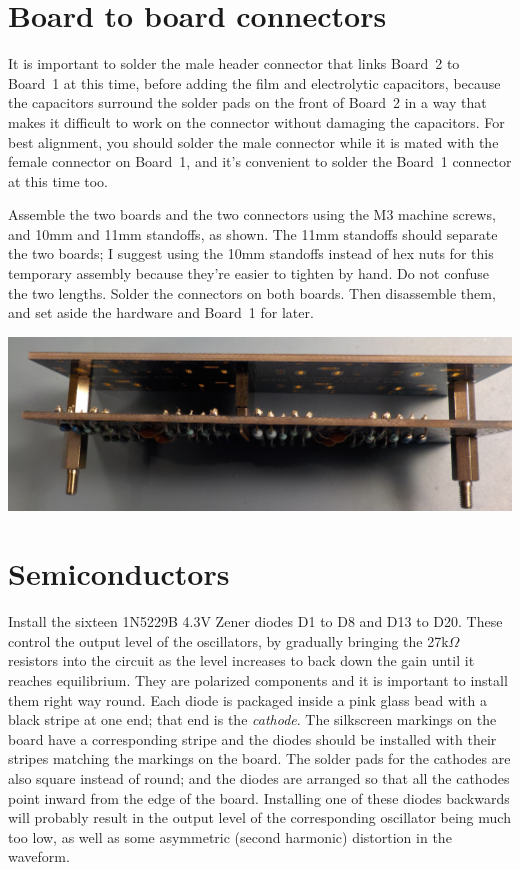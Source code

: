 \section{Board to board connectors}

It is important to solder the male header connector that links Board~2 to
Board~1 at this time, before adding the film and electrolytic capacitors,
because the capacitors surround the solder pads on the front of Board~2 in a
way that makes it difficult to work on the connector without damaging the
capacitors.  For best alignment, you should solder the male connector while
it is mated with the female connector on Board~1, and it's convenient to
solder the Board~1 connector at this time too.

Assemble the two boards and the two connectors using the M3 machine screws,
and 10mm and 11mm standoffs, as shown.  The 11mm standoffs should separate
the two boards; I suggest using the 10mm standoffs instead of hex nuts for
this temporary assembly because they're easier to tighten by hand.  Do not
confuse the two lengths.  Solder the connectors on both boards.  Then
disassemble them, and set aside the hardware and Board~1 for later.

\noindent\includegraphics[width=\linewidth]{b2b-stack.jpg}

\section{Semiconductors}

Install the sixteen 1N5229B 4.3V Zener diodes D1 to D8 and D13 to D20. 
These control the output level of the oscillators, by gradually bringing the
27k$\Omega$ resistors into the circuit as the level increases to back down
the gain until it reaches equilibrium.  They are polarized components and it
is important to install them right way round.  Each diode is packaged inside
a pink glass bead with a black stripe at one end; that end is the
\emph{cathode}.  The silkscreen markings on the board have a corresponding
stripe and the diodes should be installed with their stripes matching the
markings on the board.  The solder pads for the cathodes are also square
instead of round; and the diodes are arranged so that all the cathodes point
inward from the edge of the board.  Installing one of these diodes backwards
will probably result in the output level of the corresponding oscillator
being much too low, as well as some asymmetric (second harmonic) distortion
in the waveform.

